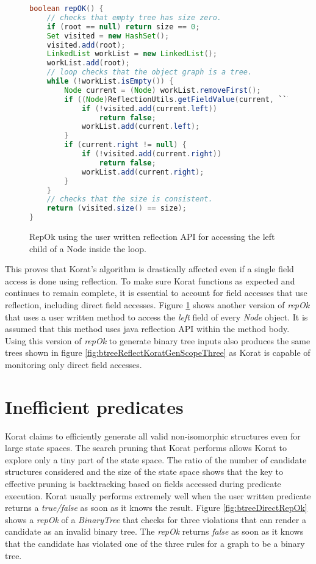 \begin{figure}
\centering
\begin{lstlisting}[language=Java]
boolean repOK() {
    // checks that empty tree has size zero.
    if (root == null) return size == 0;
    Set visited = new HashSet();
    visited.add(root);
    LinkedList workList = new LinkedList();
    workList.add(root);
    // loop checks that the object graph is a tree.
    while (!workList.isEmpty()) {
        Node current = (Node) workList.removeFirst();
        if ((Node)ReflectionUtils.getFieldValue(current, ``left'') != null) {
            if (!visited.add(current.left))
                return false;
            workList.add(current.left);
        }
        if (current.right != null) {
            if (!visited.add(current.right))
                return false;
            workList.add(current.right);
        }
    }
    // checks that the size is consistent.
    return (visited.size() == size);
}
\end{lstlisting}
\caption{RepOk using the user written reflection API for accessing the left child of a Node inside the loop.}
\label{fig:btTreeUserReflectionRepOK}
\end{figure}

\para
This proves that Korat’s algorithm is drastically affected even if a single field access is done using reflection. To make sure Korat functions as expected and continues to remain complete, it is essential to account for field accesses that use reflection, including direct field accesses. Figure \ref{fig:btTreeUserReflectionRepOK} shows another version of \emph{repOk} that uses a user written method to access the \emph{left} field of every \emph{Node} object. It is assumed that this method uses java reflection API within the method body. Using this version of \emph{repOk} to generate binary tree inputs also produces the same trees shown in figure \ref{fig:btreeReflectKoratGenScopeThree} as Korat is capable of monitoring only direct field accesses. 


\section{Inefficient predicates}
Korat claims to efficiently generate all valid non-isomorphic structures even for large state spaces. The search pruning that Korat performs allows Korat to explore only a tiny part of the state space. The ratio of the number of candidate structures considered and the size of the state space shows that the key to effective pruning is backtracking based on fields accessed during predicate execution. Korat usually performs extremely well when the user written predicate returns a \emph{true/false} as soon as it knows the result. Figure \ref{fig:btreeDirectRepOk} shows a \emph{repOk} of a \emph{BinaryTree} that checks for three violations that can render a candidate as an invalid binary tree. The \emph{repOk} returns \emph{false} as soon as it knows that the candidate has violated one of the three rules for a graph to be a binary tree.

